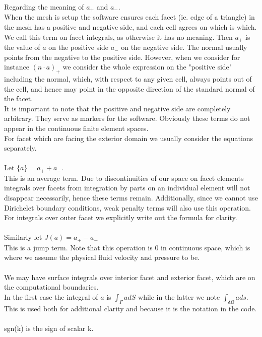 \documentclass[11pt,twoside,a4paper]{article}
\begin{document}
Regarding the meaning of $a_+$ and $a_-$.\\
When the mesh is setup the software ensures each facet (ie. edge of a triangle) in the mesh has a positive and negative side, and each cell agrees on which is which. We call this term on facet integrals, as otherwise it has no meaning. Then $a_+$ is the value of $a$ on the positive side $a_-$ on the negative side. The normal usually points from the negative to the positive side. However, when we consider for instance $(n \cdot a)_+$ we consider the whole expression on the "positive side" including the normal, which, with respect to any given cell, always points out of the cell, and hence may point in the opposite direction of the standard normal of the facet.\\
It is important to note that the positive and negative side are completely arbitrary. They serve as markers for the software. Obviously these terms do not appear in the continuous finite element spaces.\\
For facet which are facing the exterior domain we usually consider the equations separately.\\
\\
Let $\{ a \} = a_+ + a_-$. \\
This is an average term. Due to discontinuities of our space on facet elements integrals over facets from integration by parts on an individual element will not disappear necessarily, hence these terms remain. Additionally, since we cannot use Dirichelet boundary conditions, weak penalty terms will also use this operation.\\

For integrals over outer facet we explicitly write out the formula for clarity.\\
\\
Similarly let $J(a) = a_+ - a_-$\\
This is a jump term. Note that this operation is $0$ in continuous space, which is where we assume the physical fluid velocity and pressure to be.\\
\\
We may have surface integrals over interior facet and exterior facet, which are on the computational boundaries.\\
In the first case the integral of $a$ is $\int_\Gamma a dS$ while in the latter we note $\int_{\delta \Omega} a ds$.\\
This is used both for additional clarity and because it is the notation in the code.\\
\\
sgn(k) is the sign of scalar k.
\end{document}
